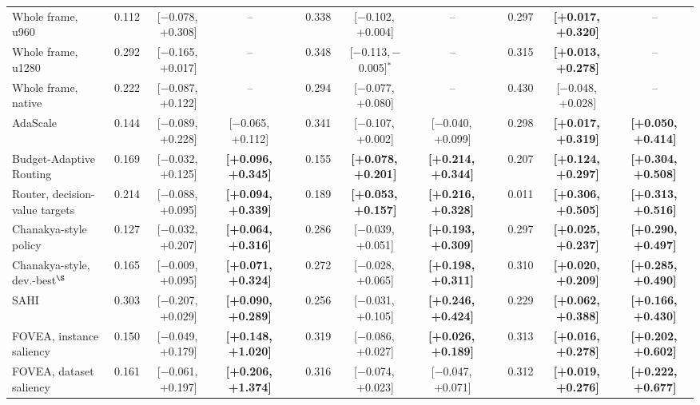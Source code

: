 \documentclass[10pt,letterpaper]{article}
\newcommand{\ci}[2]{[#1,\allowbreak\,#2]}
\newcommand{\best}[1]{\textbf{#1}}
\newcommand{\na}{--}
\newcommand{\sw}{$^{\ast}$}   %
\theoremstyle{remark}
\theoremstyle{plain}
\theoremstyle{definition}
\begin{document}
\begin{landscape}
\begin{table}[!h]
\begin{tabular}{@{}lccccccccccc@{}}
Whole frame, u960 & 0.112 & \ci{$-$0.078}{+0.308} & \na &  & 0.338 & \ci{$-$0.102}{+0.004} & \na &  & 0.297 & \best{\ci{+0.017}{+0.320}} & \na \\
Whole frame, u1280 & 0.292 & \ci{$-$0.165}{+0.017} & \na &  & 0.348 & \ci{$-$0.113}{$-$0.005}\sw & \na &  & 0.315 & \best{\ci{+0.013}{+0.278}} & \na \\
Whole frame, native & 0.222 & \ci{$-$0.087}{+0.122} & \na &  & 0.294 & \ci{$-$0.077}{+0.080} & \na &  & 0.430 & \ci{$-$0.048}{+0.028} & \na \\
\midrule
AdaScale & 0.144 & \ci{$-$0.089}{+0.228} & \ci{$-$0.065}{+0.112} &  & 0.341 & \ci{$-$0.107}{+0.002} & \ci{$-$0.040}{+0.099} &  & 0.298 & \best{\ci{+0.017}{+0.319}} & \best{\ci{+0.050}{+0.414}} \\
Budget-Adaptive Routing & 0.169 & \ci{$-$0.032}{+0.125} & \best{\ci{+0.096}{+0.345}} &  & 0.155 & \best{\ci{+0.078}{+0.201}} & \best{\ci{+0.214}{+0.344}} &  & 0.207 & \best{\ci{+0.124}{+0.297}} & \best{\ci{+0.304}{+0.508}} \\
Router, decision-value targets & 0.214 & \ci{$-$0.088}{+0.095} & \best{\ci{+0.094}{+0.339}} &  & 0.189 & \best{\ci{+0.053}{+0.157}} & \best{\ci{+0.216}{+0.328}} &  & 0.011 & \best{\ci{+0.306}{+0.505}} & \best{\ci{+0.313}{+0.516}} \\
Chanakya-style policy & 0.127 & \ci{$-$0.032}{+0.207} & \best{\ci{+0.064}{+0.316}} &  & 0.286 & \ci{$-$0.039}{+0.051} & \best{\ci{+0.193}{+0.309}} &  & 0.297 & \best{\ci{+0.025}{+0.237}} & \best{\ci{+0.290}{+0.497}} \\
Chanakya-style, dev.-best$^{\S}$ & 0.165 & \ci{$-$0.009}{+0.095} & \best{\ci{+0.071}{+0.324}} &  & 0.272 & \ci{$-$0.028}{+0.065} & \best{\ci{+0.198}{+0.311}} &  & 0.310 & \best{\ci{+0.020}{+0.209}} & \best{\ci{+0.285}{+0.490}} \\
\midrule
SAHI & 0.303 & \ci{$-$0.207}{+0.029} & \best{\ci{+0.090}{+0.289}} &  & 0.256 & \ci{$-$0.031}{+0.105} & \best{\ci{+0.246}{+0.424}} &  & 0.229 & \best{\ci{+0.062}{+0.388}} & \best{\ci{+0.166}{+0.430}} \\
FOVEA, instance saliency & 0.150 & \ci{$-$0.049}{+0.179} & \best{\ci{+0.148}{+1.020}} &  & 0.319 & \ci{$-$0.086}{+0.027} & \best{\ci{+0.026}{+0.189}} &  & 0.313 & \best{\ci{+0.016}{+0.278}} & \best{\ci{+0.202}{+0.602}} \\
FOVEA, dataset saliency & 0.161 & \ci{$-$0.061}{+0.197} & \best{\ci{+0.206}{+1.374}} &  & 0.316 & \ci{$-$0.074}{+0.023} & \ci{$-$0.047}{+0.071} &  & 0.312 & \best{\ci{+0.019}{+0.276}} & \best{\ci{+0.222}{+0.677}} \\

\end{tabular}
\end{table}
\end{landscape}
\end{document}
